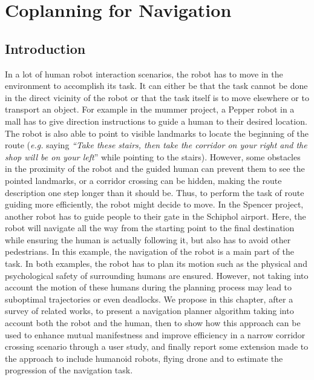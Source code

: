 \documentclass[a4paper,11pt,twoside]{StyleThese}
\begin{document}
\setcounter{chapter}{1} %
\dominitoc
\faketableofcontents
\fi

\chapter{Coplanning for Navigation}
\label{chapter:navigation}
\minitoc

\section{Introduction}
In a lot of human robot interaction scenarios, the robot has to move in the environment to accomplish its task. It can either be that the task cannot be done in the direct vicinity of the robot or that the task itself is to move elsewhere or to transport an object. For example in the \acrshort{mummer} project, a Pepper robot in a mall has to give direction instructions to guide a human to their desired location. The robot is also able to point to visible landmarks to locate the beginning of the route (\textit{e.g.} saying \textit{``Take these stairs, then take the corridor on your right and the shop will be on your left}'' while pointing to the stairs). However, some obstacles in the proximity of the robot and the guided human can prevent them to see the pointed landmarks, or a corridor crossing can be hidden, making the route description one step longer than it should be. Thus, to perform the task of route guiding more efficiently, the robot might decide to move.
In the Spencer project, another robot has to guide people to their gate in the Schiphol airport. Here, the robot will navigate all the way from the starting point to the final destination while ensuring the human is actually following it, but also has to avoid other pedestrians. In this example, the navigation of the robot is a main part of the task.
In both examples, the robot has to plan its motion such as the physical and psychological safety of surrounding humans are ensured. However, not taking into account the motion of these humans during the planning process may lead to suboptimal trajectories or even deadlocks.
We propose in this chapter, after a survey of related works, to present a navigation planner algorithm taking into account both the robot and the human, then to show how this approach can be used to enhance mutual manifestness and improve efficiency in a narrow corridor crossing scenario through a user study, and finally report some extension made to the approach to include humanoid robots, flying drone and to estimate the progression of the navigation task. 
\end{document}
